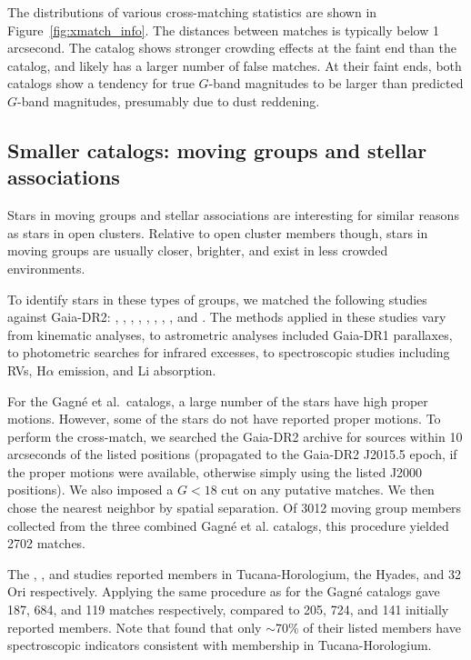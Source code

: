 \documentclass[12pt,twocolumn,tighten]{aastex62}
\begin{document}
The distributions of various cross-matching statistics are shown in
Figure~\ref{fig:xmatch_info}.  The distances between matches is
typically below 1 arcsecond.  The \citeauthor{dias_proper_2014}
catalog shows stronger crowding effects at the faint end than
the \citeauthor{Kharchenko_et_al_2013} catalog, and likely has a
larger number of false matches.  At their faint ends, both catalogs
show a tendency for true $G$-band magnitudes to be larger than
predicted $G$-band magnitudes, presumably due to dust reddening.


\subsection{Smaller catalogs: moving groups and stellar associations}
\label{subsec:mg}

Stars in moving groups and stellar associations are interesting for
similar reasons as stars in open clusters.  
Relative to open cluster members though, stars in moving groups are 
usually closer, brighter, and
exist in less crowded environments.

To identify stars in these types of groups, we matched the following studies
against Gaia-DR2:
\citet{gagne_banyan_XII_2018},
\citet{gagne_banyan_XI_2018},
\citet{gagne_banyan_XIII_2018},
\citet{kraus_tucanahor_2014},
\citet{roser_deep_2011}, %
\citet{bell_32ori_2017},
\citet{rizzuto_multidimensional_2011},
\citet{oh_comoving_2017}, and
\citet{zari_3d_2018}. The methods applied in these studies
vary from kinematic analyses, to astrometric analyses included
Gaia-DR1 parallaxes, to photometric searches for infrared excesses, to
spectroscopic studies including RVs, H$\alpha$
emission, and Li absorption.

For the Gagn\'e et al{.}~catalogs, a large number of the stars have
high proper motions.  However, some of the stars do not have reported
proper motions.  To perform the cross-match, we searched the Gaia-DR2
archive for sources within 10 arcseconds of the listed positions
(propagated to the Gaia-DR2 J2015.5 epoch, if the proper motions were
available, otherwise simply using the listed J2000 positions).  We
also imposed a $G<18$ cut on any putative matches.  We then chose the
nearest neighbor by spatial separation.  Of 3012 moving group members
collected from the three combined Gagn\'e et al{.} catalogs, this
procedure yielded 2702 matches.

The \citet{kraus_tucanahor_2014}, \citet{roser_deep_2011}, and
\citet{bell_32ori_2017} studies reported members in Tucana-Horologium,
the Hyades, and 32$\,$Ori respectively.  Applying the same procedure
as for the Gagn\'e catalogs gave 187, 684, and 119 matches
respectively, compared to 205, 724, and 141 initially reported
members.  Note that \citet{kraus_tucanahor_2014} found that only
$\sim$70\% of their listed members have spectroscopic indicators
consistent with membership in Tucana-Horologium.
\end{document}
